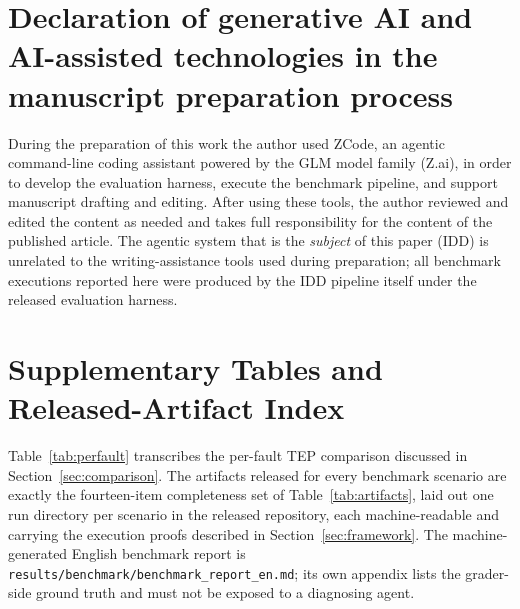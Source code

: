 \documentclass[preprint,12pt]{elsarticle}
\begin{document}
\section*{Declaration of generative AI and AI-assisted technologies in the manuscript preparation process}
During the preparation of this work the author used ZCode, an agentic command-line coding assistant powered by the GLM model family (Z.ai), in order to develop the evaluation harness, execute the benchmark pipeline, and support manuscript drafting and editing. After using these tools, the author reviewed and edited the content as needed and takes full responsibility for the content of the published article. The agentic system that is the \emph{subject} of this paper (IDD) is unrelated to the writing-assistance tools used during preparation; all benchmark executions reported here were produced by the IDD pipeline itself under the released evaluation harness.




\appendix

\section{Supplementary Tables and Released-Artifact Index}\label{app:artifacts}

\setcounter{table}{0}
\renewcommand{\thetable}{A\arabic{table}}
\renewcommand{\theHtable}{A\arabic{table}}

Table~\ref{tab:perfault} transcribes the per-fault TEP comparison discussed in
Section~\ref{sec:comparison}. The artifacts released for every benchmark scenario are exactly
the fourteen-item completeness set of Table~\ref{tab:artifacts}, laid out one run directory
per scenario in the released repository, each machine-readable and carrying the execution
proofs described in Section~\ref{sec:framework}. The machine-generated English benchmark
report is \texttt{results/benchmark/benchmark\_report\_en.md}; its own appendix lists the
grader-side ground truth and must not be exposed to a diagnosing agent.
\end{document}
